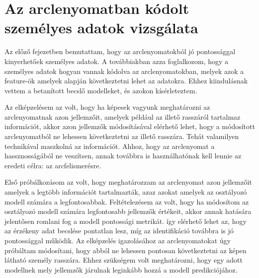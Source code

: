 \section{Az arclenyomatban kódolt személyes adatok vizsgálata} %
\label{sec:5}


Az előző fejezetben bemutattam, hogy az arclenyomatokból jó pontossággal kinyerhetőek személyes adatok. A továbbiakban azza foglalkozom, hogy a személyes adatok hogyan vannak kódolva az arclenyomatokban, melyek azok a feature-ök amelyek alapján következtetni lehet az adatokra. Ehhez kiindulásnak vettem a betanított becslő modelleket, és azokon kísérleteztem.

Az elképzelésem az volt, hogy ha képesek vagyunk meghatározni az arclenyomatnak azon jellemzőit, amelyek például az illető rasszáról tartalmaz információt, akkor azon jellemzők módosításával elérhető lehet, hogy a módosított arclenyomatból ne lehessen következtetni az illető rasszára. Tehát valamilyen technikával maszkolná az információt. Ahhoz, hogy az arclenyomat a hassznosságából ne veszítsen, annak továbbra is használhatónak kell lennie az eredeti célra: az arcfelismerésre.

Első próbálkozásom az volt, hogy meghatározzam az arclenyomat azon jellemzőit amelyek a legtöbb információt tartalmazták, azaz azokat amelyek az osztályozó modell számára a legfontosabbak. Feltételezésem az volt, hogy ha módosítom az osztályozó modell számára legfontosabb jellemzők értékeit, akkor annak hatására jelentősen romlani fog a modell pontossági metrikát. így elérhető lehet az, hogy az érzékeny adat becslése pontatlan lesz, míg az identifikáció továbbra is jó pontossággal működik. Az elképzelés igazolásához az arclenyomatokat úgy próbáltam módosítani, hogy abból ne lehessen pontosan következtetni az képen látható személy rasszára. Ehhez szükségem volt meghatározni, hogy egy adott modellnek mely jellemzők járulnak leginkább hozzá a modell predikciójához.

